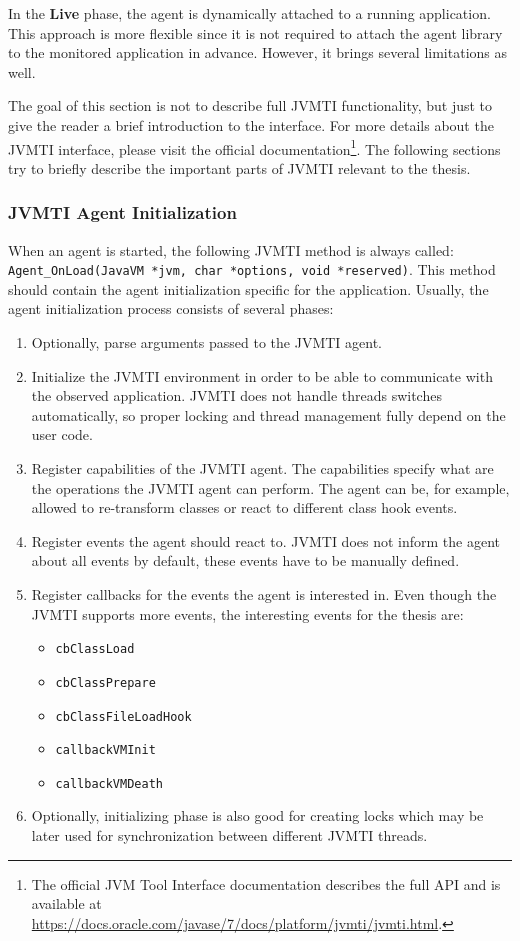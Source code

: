In the \textbf{Live} phase, the agent is dynamically attached to a running application. This approach is more flexible since it is not required to attach the agent library to the monitored application in advance. However, it brings several limitations as well.

The goal of this section is not to describe full JVMTI functionality, but just to give the reader a brief introduction to the interface. For more details about the JVMTI interface, please visit the official documentation\footnote{The official JVM Tool Interface documentation describes the full API and is available at \url{https://docs.oracle.com/javase/7/docs/platform/jvmti/jvmti.html}.}. The following sections try to briefly describe the important parts of JVMTI relevant to the thesis.

\subsubsection{JVMTI Agent Initialization}
\label{subsec:jvmti_init}
When an agent is started, the following JVMTI method is always called: \linebreak \texttt{Agent\_OnLoad(JavaVM *jvm, char *options, void *reserved)}.  \linebreak This method should contain the agent initialization specific for the application. Usually, the agent initialization process consists of several phases:
\begin{enumerate}
	\item Optionally, parse arguments passed to the JVMTI agent.
	\item Initialize the JVMTI environment in order to be able to communicate with the observed application. JVMTI does not handle threads switches automatically, so proper locking and thread management fully depend on the user code.
	\item Register capabilities of the JVMTI agent. The capabilities specify what are the operations the JVMTI agent can perform. The agent can be, for example, allowed to re-transform classes or react to different class hook events.
	\item Register events the agent should react to. JVMTI does not inform the agent about all events by default, these events have to be manually defined.
	\item Register callbacks for the events the agent is interested in. Even though the JVMTI supports more events, the interesting events for the thesis are: 
		\begin{itemize}
			\item \texttt{cbClassLoad}
			\item \texttt{cbClassPrepare}
			\item \texttt{cbClassFileLoadHook}
			\item \texttt{callbackVMInit}
			\item \texttt{callbackVMDeath}
		\end{itemize}
	\item Optionally, initializing phase is also good for creating locks which may be later used for synchronization between different JVMTI threads.
\end{enumerate}

